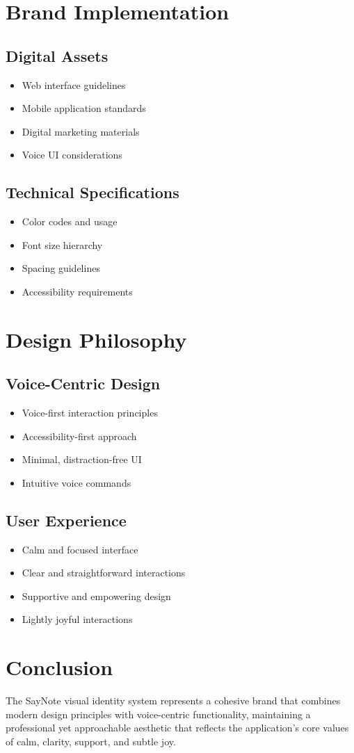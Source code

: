 \section{Brand Implementation}
\subsection{Digital Assets}
\begin{itemize}
    \item Web interface guidelines
    \item Mobile application standards
    \item Digital marketing materials
    \item Voice UI considerations
\end{itemize}

\subsection{Technical Specifications}
\begin{itemize}
    \item Color codes and usage
    \item Font size hierarchy
    \item Spacing guidelines
    \item Accessibility requirements
\end{itemize}

\section{Design Philosophy}
\subsection{Voice-Centric Design}
\begin{itemize}
    \item Voice-first interaction principles
    \item Accessibility-first approach
    \item Minimal, distraction-free UI
    \item Intuitive voice commands
\end{itemize}

\subsection{User Experience}
\begin{itemize}
    \item Calm and focused interface
    \item Clear and straightforward interactions
    \item Supportive and empowering design
    \item Lightly joyful interactions
\end{itemize}

\section{Conclusion}
The SayNote visual identity system represents a cohesive brand that combines modern design principles with voice-centric functionality, maintaining a professional yet approachable aesthetic that reflects the application's core values of calm, clarity, support, and subtle joy.
